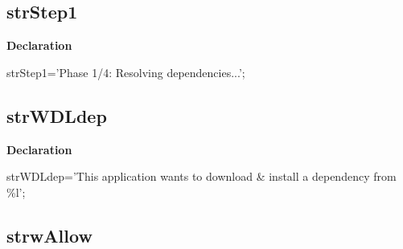 \documentclass{report}
\newif\ifpdf
\begin{document}
\subsection*{strStep1}
\fi
\label{trstrings-strStep1}
\begin{list}{}{
\setlength{\itemindent}{0cm}
\setlength{\listparindent}{0cm}
\setlength{\leftmargin}{\evensidemargin}
\addtolength{\leftmargin}{\tmplength}
\settowidth{\labelsep}{X}
\addtolength{\leftmargin}{\labelsep}
\setlength{\labelwidth}{\tmplength}
}
\item[\textbf{Declaration}\hfill]
\ifpdf
\begin{flushleft}
\fi
\begin{ttfamily}
strStep1='Phase 1/4: Resolving dependencies...';\end{ttfamily}

\ifpdf
\end{flushleft}
\fi

\end{list}
\ifpdf
\subsection*{\large{\textbf{strWDLdep}}\normalsize\hspace{1ex}\hrulefill}
\else
\subsection*{strWDLdep}
\fi
\label{trstrings-strWDLdep}
\begin{list}{}{
\setlength{\itemindent}{0cm}
\setlength{\listparindent}{0cm}
\setlength{\leftmargin}{\evensidemargin}
\addtolength{\leftmargin}{\tmplength}
\settowidth{\labelsep}{X}
\addtolength{\leftmargin}{\labelsep}
\setlength{\labelwidth}{\tmplength}
}
\item[\textbf{Declaration}\hfill]
\ifpdf
\begin{flushleft}
\fi
\begin{ttfamily}
strWDLdep='This application wants to download {\&} install a dependency from {\%}l';\end{ttfamily}

\ifpdf
\end{flushleft}
\fi

\end{list}
\ifpdf
\subsection*{\large{\textbf{strwAllow}}\normalsize\hspace{1ex}\hrulefill}
\else
\end{document}
